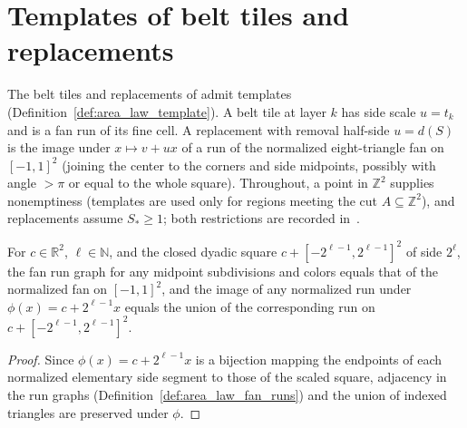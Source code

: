 \section{Templates of belt tiles and replacements}
\label{sec:area_law_belt_replacement_templates}

The belt tiles and replacements of \cite[Section~11]{OpenAI2026AreaLaw} admit
templates (Definition~\ref{def:area_law_template}). A belt tile at layer $k$ has
side scale $u=t_k$ and is a fan run of its fine cell. A replacement with removal
half-side $u=d(S)$ is the image under $x\mapsto v+ux$ of a run of the normalized
eight-triangle fan on $[-1,1]^2$ (joining the center to the corners and side
midpoints, possibly with angle $>\pi$ or equal to the whole square). Throughout,
a point in $\mathbb Z^2$ supplies nonemptiness (templates are used only for
regions meeting the cut $A\subseteq\mathbb Z^2$), and replacements assume
$S_*\ge1$; both restrictions are recorded
in~\cite{gap:arealaw2d_belt_replacement_template_scope}.


\begin{lemma}
    \label{thm:area_law_centered_fan_run_image}
    \leanok
    For $c\in\mathbb R^2$, $\ell\in\mathbb N$, and the closed dyadic square
    $c+[-2^{\ell-1},2^{\ell-1}]^2$ of side $2^\ell$, the fan run graph for any
    midpoint subdivisions and colors equals that of the normalized fan on
    $[-1,1]^2$, and the image of any normalized run under
    $\phi(x)=c+2^{\ell-1}x$ equals the union of the corresponding run on
    $c+[-2^{\ell-1},2^{\ell-1}]^2$.
\end{lemma}
\begin{proof}\leanok
    Since $\phi(x)=c+2^{\ell-1}x$ is a bijection mapping the endpoints of each
    normalized elementary side segment to those of the scaled square, adjacency
    in the run graphs (Definition~\ref{def:area_law_fan_runs}) and the union of
    indexed triangles are preserved under $\phi$.
\end{proof}

